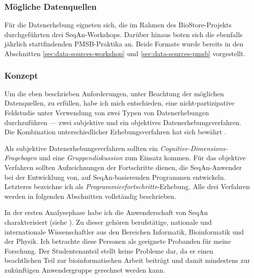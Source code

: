 \subsubsection{Mögliche Datenquellen}

Für die Datenerhebung eigneten sich, die im Rahmen des BioStore-Projekts durchgeführten drei SeqAn-Workshops. Darüber hinaus boten sich die ebenfalls jährlich stattfindenden PMSB-Praktika an. Beide Formate wurde bereits in den Abschnitten \ref{sec:data-sources-workshop} und \ref{sec:data-sources-pmsb} vorgestellt.
 
 
\subsubsection{Konzept}

Um die eben beschrieben Anforderungen, unter Beachtung der möglichen Datenquellen, zu erfüllen, habe ich mich entschieden, eine nicht-partizipative Feldstudie unter Verwendung von zwei Typen von Datenerhebungen durchzuführen --- zwei subjektive und ein objektives Datenerhebungsverfahren. Die Kombination unterschiedlicher Erhebungsverfahren hat sich bewährt \cite[vgl.][]{LaToza:2007fj,deSouza:2004fd,Letondal:2006dy,Grill:2012jm,Piccioni:2013uq}.

Als subjektive Datenerhebungsverfahren sollten ein \textit{Cognitive-Dimensions-Fragebogen} und eine \textit{Gruppendiskussion} zum Einsatz kommen. Für das objektive Verfahren sollten Aufzeichnungen der Fortschritte dienen, die SeqAn-Anwender bei der Entwicklung von, auf SeqAn-basierenden Programmen entwickeln. Letzteres bezeichne ich als \textit{Programmierfortschritte}-Erhebung. Alle drei Verfahren werden in folgenden Abschnitten vollständig beschrieben.

In der ersten Analysephase habe ich die Anwenderschaft von SeqAn charakterisiert (siehe ). Zu dieser gehören berufstätige, nationale und internationale Wissenschaftler aus den Bereichen Informatik, Bioinformatik und der Physik. Ich betrachte diese Personen als geeignete Probanden für meine Forschung. Der Studentenanteil stellt keine Probleme dar, da er einen beachtlichen Teil zur bioinformatischen Arbeit beiträgt \citep{Letondal:2006dy} und damit mindestens zur zukünftigen Anwendergruppe gerechnet werden kann.

















